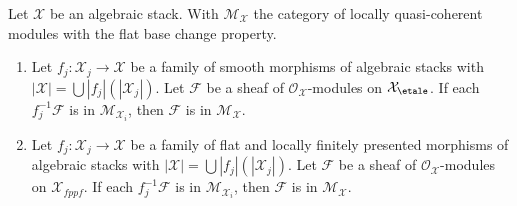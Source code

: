 \begin{lemma}
\label{lemma-check-lqc-fbc-on-covering}
Let $\mathcal{X}$ be an algebraic stack. With $\mathcal{M}_\mathcal{X}$
the category of locally quasi-coherent modules with the flat base change
property.
\begin{enumerate}
\item Let $f_j : \mathcal{X}_j \to \mathcal{X}$ be a family of smooth
morphisms of algebraic stacks with
$|\mathcal{X}| =\bigcup |f_j|(|\mathcal{X}_j|)$.
Let $\mathcal{F}$ be a sheaf of $\mathcal{O}_\mathcal{X}$-modules
on $\mathcal{X}_\etale$. If each $f_j^{-1}\mathcal{F}$
is in $\mathcal{M}_{\mathcal{X}_i}$, then $\mathcal{F}$ is in
$\mathcal{M}_\mathcal{X}$.
\item  Let $f_j : \mathcal{X}_j \to \mathcal{X}$ be a family of flat
and locally finitely presented morphisms of algebraic stacks with
$|\mathcal{X}| =\bigcup |f_j|(|\mathcal{X}_j|)$.
Let $\mathcal{F}$ be a sheaf of $\mathcal{O}_\mathcal{X}$-modules
on $\mathcal{X}_{fppf}$. If each $f_j^{-1}\mathcal{F}$
is in $\mathcal{M}_{\mathcal{X}_i}$, then $\mathcal{F}$ is in
$\mathcal{M}_\mathcal{X}$.
\end{enumerate}
\end{lemma}

